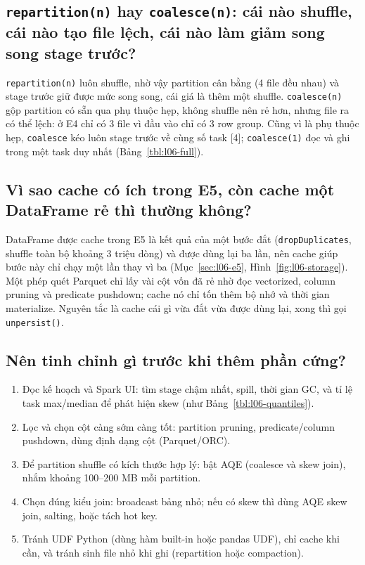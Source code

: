 \documentclass[
  12pt,
  a4paper,
]{report}
\providecommand{\tightlist}{%
  \setlength{\itemsep}{0pt}\setlength{\parskip}{0pt}}
\begin{document}
\subsection{\texorpdfstring{\texttt{repartition(n)} hay
\texttt{coalesce(n)}: cái nào shuffle, cái nào tạo file lệch, cái nào
làm giảm song song stage
trước?}{repartition(n) hay coalesce(n): cái nào shuffle, cái nào tạo file lệch, cái nào làm giảm song song stage trước?}}\label{sec:l06-q6}

\texttt{repartition(n)} luôn shuffle, nhờ vậy partition cân bằng (4 file
đều nhau) và stage trước giữ được mức song song, cái giá là thêm một
shuffle. \texttt{coalesce(n)} gộp partition có sẵn qua phụ thuộc hẹp,
không shuffle nên rẻ hơn, nhưng file ra có thể lệch: ở E4 chỉ có 3 file
vì đầu vào chỉ có 3 row group. Cũng vì là phụ thuộc hẹp,
\texttt{coalesce} kéo luôn stage trước về cùng số task {[}4{]};
\texttt{coalesce(1)} đọc và ghi trong một task duy nhất
(Bảng~\ref{tbl:l06-full}).

\subsection{Vì sao cache có ích trong E5, còn cache một DataFrame rẻ thì
thường không?}\label{sec:l06-q7}

DataFrame được cache trong E5 là kết quả của một bước đắt
(\texttt{dropDuplicates}, shuffle toàn bộ khoảng 3 triệu dòng) và được
dùng lại ba lần, nên cache giúp bước này chỉ chạy một lần thay vì ba
(Mục~\ref{sec:l06-e5}, Hình~\ref{fig:l06-storage}). Một phép quét
Parquet chỉ lấy vài cột vốn đã rẻ nhờ đọc vectorized, column pruning và
predicate pushdown; cache nó chỉ tốn thêm bộ nhớ và thời gian
materialize. Nguyên tắc là cache cái gì vừa đắt vừa được dùng lại, xong
thì gọi \texttt{unpersist()}.

\subsection{Nên tinh chỉnh gì trước khi thêm phần
cứng?}\label{sec:l06-q8}

\begin{enumerate}
\def\labelenumi{\arabic{enumi}.}
\tightlist
\item
  Đọc kế hoạch và Spark UI: tìm stage chậm nhất, spill, thời gian GC, và
  tỉ lệ task max/median để phát hiện skew (như
  Bảng~\ref{tbl:l06-quantiles}).
\item
  Lọc và chọn cột càng sớm càng tốt: partition pruning, predicate/column
  pushdown, dùng định dạng cột (Parquet/ORC).
\item
  Để partition shuffle có kích thước hợp lý: bật AQE (coalesce và skew
  join), nhắm khoảng 100--200 MB mỗi partition.
\item
  Chọn đúng kiểu join: broadcast bảng nhỏ; nếu có skew thì dùng AQE skew
  join, salting, hoặc tách hot key.
\item
  Tránh UDF Python (dùng hàm built-in hoặc pandas UDF), chỉ cache khi
  cần, và tránh sinh file nhỏ khi ghi (repartition hoặc compaction).
\end{enumerate}
\end{document}
